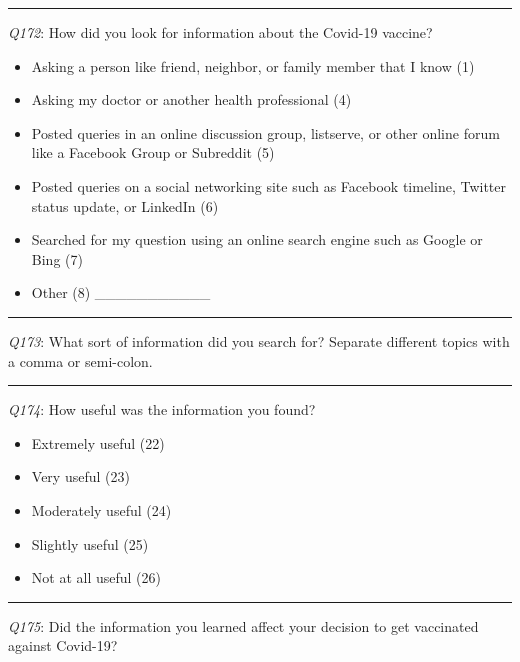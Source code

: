 \begin{center}\rule{0.5\linewidth}{0.5pt}\end{center}

\emph{Q172}: How did you look for information about the Covid-19 vaccine?

\begin{itemize}
\tightlist
\item
  Asking a person like friend, neighbor, or family member that I know (1)
\item
  Asking my doctor or another health professional (4)
\item
  Posted queries in an online discussion group, listserve, or other online forum like a Facebook Group or Subreddit (5)
\item
  Posted queries on a social networking site such as Facebook timeline, Twitter status update, or LinkedIn (6)
\item
  Searched for my question using an online search engine such as Google or Bing (7)
\item
  Other (8) \_\_\_\_\_\_\_\_\_\_\_
\end{itemize}

\begin{center}\rule{0.5\linewidth}{0.5pt}\end{center}

\emph{Q173}: What sort of information did you search for?
Separate different topics with a comma or semi-colon.

\begin{center}\rule{0.5\linewidth}{0.5pt}\end{center}

\emph{Q174}: How useful was the information you found?

\begin{itemize}
\tightlist
\item
  Extremely useful (22)
\item
  Very useful (23)
\item
  Moderately useful (24)
\item
  Slightly useful (25)
\item
  Not at all useful (26)
\end{itemize}

\begin{center}\rule{0.5\linewidth}{0.5pt}\end{center}

\emph{Q175}: Did the information you learned affect your decision to get vaccinated against Covid-19?

